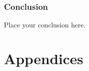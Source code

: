 \documentclass[NOTE, atlasdraft=true, texlive=2016, UKenglish]{atlasdoc}
\begin{document}


\section{Conclusion}
\label{sec:conclusion}

Place your conclusion here.


\printbibliography
%
%

\clearpage


\clearpage
\appendix
\part*{Appendices}

\clearpage

\end{document}
